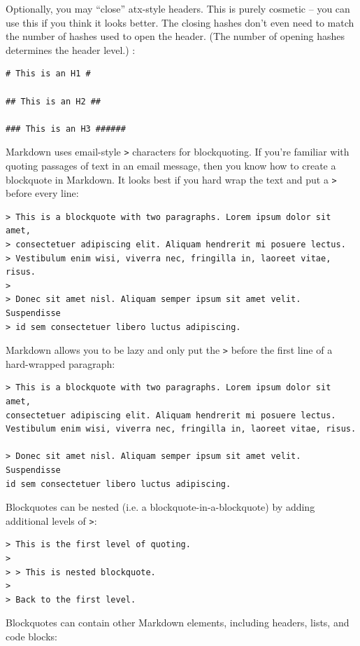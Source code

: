 Optionally, you may ``close'' atx-style headers. This is purely
cosmetic -- you can use this if you think it looks better. The
closing hashes don't even need to match the number of hashes
used to open the header. (The number of opening hashes
determines the header level.) :

\begin{verbatim}
# This is an H1 #

## This is an H2 ##

### This is an H3 ######
\end{verbatim}

Markdown uses email-style \texttt{>} characters for blockquoting. If you're
familiar with quoting passages of text in an email message, then you
know how to create a blockquote in Markdown. It looks best if you hard
wrap the text and put a \texttt{>} before every line:

\begin{verbatim}
> This is a blockquote with two paragraphs. Lorem ipsum dolor sit amet,
> consectetuer adipiscing elit. Aliquam hendrerit mi posuere lectus.
> Vestibulum enim wisi, viverra nec, fringilla in, laoreet vitae, risus.
> 
> Donec sit amet nisl. Aliquam semper ipsum sit amet velit. Suspendisse
> id sem consectetuer libero luctus adipiscing.
\end{verbatim}

Markdown allows you to be lazy and only put the \texttt{>} before the first
line of a hard-wrapped paragraph:

\begin{verbatim}
> This is a blockquote with two paragraphs. Lorem ipsum dolor sit amet,
consectetuer adipiscing elit. Aliquam hendrerit mi posuere lectus.
Vestibulum enim wisi, viverra nec, fringilla in, laoreet vitae, risus.

> Donec sit amet nisl. Aliquam semper ipsum sit amet velit. Suspendisse
id sem consectetuer libero luctus adipiscing.
\end{verbatim}

Blockquotes can be nested (i.e. a blockquote-in-a-blockquote) by
adding additional levels of \texttt{>}:

\begin{verbatim}
> This is the first level of quoting.
>
> > This is nested blockquote.
>
> Back to the first level.
\end{verbatim}

Blockquotes can contain other Markdown elements, including headers, lists,
and code blocks:


